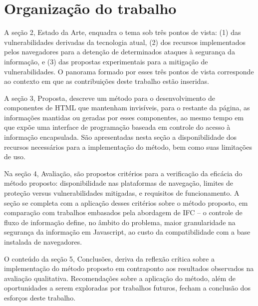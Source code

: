\section{Organização do trabalho}


A seção 2, Estado da Arte, enquadra o tema sob três pontos de vista: (1) das vulnerabilidades derivadas da tecnologia atual, (2) dos recursos implementados pelos navegadores para a detenção de determinados ataques à segurança da informação, e (3) das propostas experimentais para a mitigação de vulnerabilidades. O panorama formado por esses três pontos de vista corresponde ao contexto em que as contribuições deste trabalho estão inseridas.

A seção 3, Proposta, descreve um método para o desenvolvimento de componentes de HTML que mantenham invisíveis, para o restante da página, as informações mantidas ou geradas por esses componentes, ao mesmo tempo em que expõe uma interface de programação baseada em controle do acesso à informação encapsulada. São apresentadas nesta seção a disponibilidade dos recursos necessários para a implementação do método, bem como suas limitações de uso.

Na seção 4, Avaliação, são propostos critérios para a verificação da eficácia do método proposto: disponibilidade nas plataformas de navegação, limites de proteção versus vulnerabilidades mitigadas, e requisitos de funcionamento. A seção se completa com a aplicação desses critérios sobre o método proposto, em comparação com trabalhos embasados pela abordagem de IFC -- o controle de fluxo de informação define, no âmbito do problema, maior granularidade na segurança da informação em Javascript, ao custo da compatibilidade com a base instalada de navegadores.

O conteúdo da seção 5, Conclusões, deriva da reflexão crítica sobre a implementação do método proposto em contraponto aos resultados observados na avaliação qualitativa. Recomendações sobre a aplicação do método, além de oportunidades a serem exploradas por trabalhos futuros, fecham a conclusão dos esforços deste trabalho.